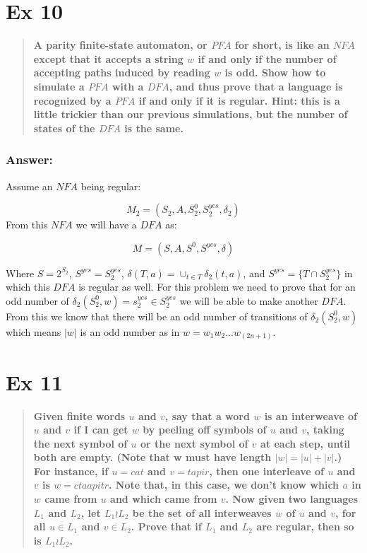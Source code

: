 \documentclass[titlepage]{article}\usepackage[]{graphicx}\usepackage[]{color}
\begin{document}

\section*{Ex 10}
\begin{quote}
  \textbf{ A parity finite-state automaton, or $PFA$ for short, is like an
    $NFA$ except that it accepts a string $w$ if and only if the number of
    accepting paths induced by reading $w$ is odd. Show how to simulate a $PFA$
    with a $DFA$, and thus prove that a language is recognized by a $PFA$ if
    and only if it is regular. Hint: this is a little trickier than our
  previous simulations, but the number of states of the $DFA$ is the same.}
\end{quote}

\subsubsection*{Answer:}
Assume an $NFA$ being regular:

\[ 
  M_2 = (S_2, A, S^0_2, S^{yes}_2, \delta_2)
\]
From this $NFA$ we will have a $DFA$ as:

\[ 
  M = (S, A, S^0, S^{yes}, \delta)
\]

Where $S = 2^{S_2}$, $S^{yes} = {S^{yes}_2}$, $\delta(T, a) = \cup_{t\in T}
\delta_2(t, a)$, and $S^{yes} = \{T\cap S^{yes}_2\}$ in which this $DFA$ is
regular as well. For this problem we need to prove that for an odd number of
$\delta_2(S^0_2, w) = s^{yes}_2 \in S^{yes}_2$ we will be able to make another
$DFA$. From this we know that there will be an odd number of transitions of
$\delta_2(S^0_2, w)$ which means $|w|$ is an odd number as in
$w=w_1w_2...w_(2n+1)$.  






\section*{Ex 11} 
\begin{quote} \textbf{Given finite words $u$ and $v$, say that
    a word $w$ is an interweave of $u$ and $v$ if I can get $w$ by peeling off
    symbols of $u$ and $v$, taking the next symbol of $u$ or the next symbol of
    $v$ at each step, until both are empty. (Note that w must have length $|w|
    = |u| + |v|$.) For instance, if $u = cat$ and $v = tapir$, then one
    interleave of $u$ and $v$ is $w = ctaapitr$. Note that, in this case, we
    don't know which $a$ in $w$ came from $u$ and which came from $v$. Now
    given two languages $L_{1}$ and $L_{2}$, let $L_{1} \wr L_{2}$ be the set
    of all interweaves $w$ of $u$ and $v$, for all $u \in L_{1}$ and $v \in
    L_{2}$. Prove that if $L_{1}$ and $L_{2}$ are regular, then so is $L_{1}
    \wr L_{2}$.}
\end{quote}
\end{document}

